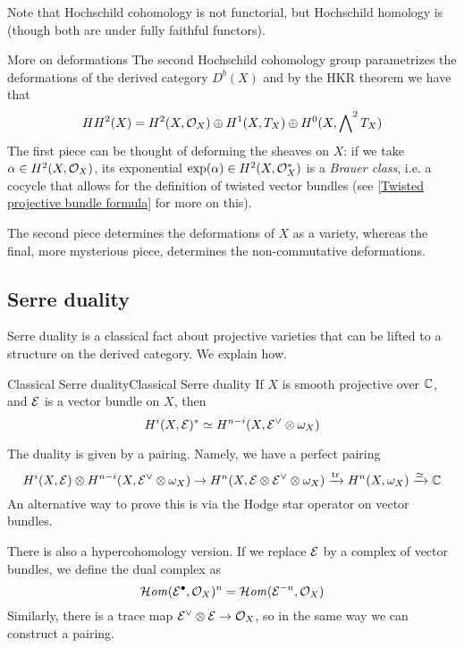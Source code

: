 Note that Hochschild cohomology is not functorial, but Hochschild homology is (though both are under fully faithful functors). 

\begin{remark}{More on deformations}{}
    The second Hochschild cohomology group parametrizes the deformations of the derived category $D^b(X)$ and by the HKR theorem we have that $$HH^2(X)=H^2(X,\mathcal{O}_X)\oplus H^1(X,T_X)\oplus H^0(X, \bigwedge\nolimits^2 T_X) $$
The first piece can be thought of deforming the sheaves on $X$: if we take $\alpha \in H^2(X,\mathcal{O}_X)$, its exponential $\exp(\alpha)\in H^2(X,\mathcal{O}_X^*)$ is a \emph{Brauer class}, i.e. a cocycle that allows for the definition of twisted vector bundles (see \ref{Twisted projective bundle formula} for more on this).
\newline

The second piece determines the deformations of $X$ as a variety, whereas the final, more mysterious piece, determines the non-commutative deformations.
\end{remark}


\subsection{Serre duality}

Serre duality is a classical fact about projective varieties that can be lifted to a structure on the derived category. We explain how.

\begin{proposition}{Classical Serre duality}{Classical Serre duality}
    If $X$ is smooth projective over $\mathbb{C}$, and $\mathcal{E}$ is a vector bundle on $X$, then
    \begin{equation*}
        H^i(X,\mathcal{E})^* \simeq H^{n-i}(X,\mathcal{E}^\vee\otimes\omega_X)
    \end{equation*}
\end{proposition}

The duality is given by a pairing. Namely, we have a perfect pairing
\begin{equation*}
    H^i(X,\mathcal{E})\otimes H^{n-i}(X,\mathcal{E}^\vee\otimes\omega_X)
        \to H^n(X,\mathcal{E}\otimes\mathcal{E}^\vee\otimes\omega_X)
        \xrightarrow{\mathrm{tr}} H^n(X,\omega_X)
        \xrightarrow{\simeq} \mathbb{C}
\end{equation*}
An alternative way to prove this is via the Hodge star operator on vector bundles.

There is also a hypercohomology version. If we replace $\mathcal{E}$ by a complex of vector bundles, we define the dual complex as
\begin{equation*}
    \operatorname{\mathcal{H}\mathit{om}}(\mathcal{E}^\bullet,\mathcal{O}_X)^n = \operatorname{\mathcal{H}\mathit{om}}(\mathcal{E}^{-n},\mathcal{O}_X)
\end{equation*}
Similarly, there is a trace map $\mathcal{E}^\vee\otimes\mathcal{E}\to\mathcal{O}_X$, so in the same way we can construct a pairing.


